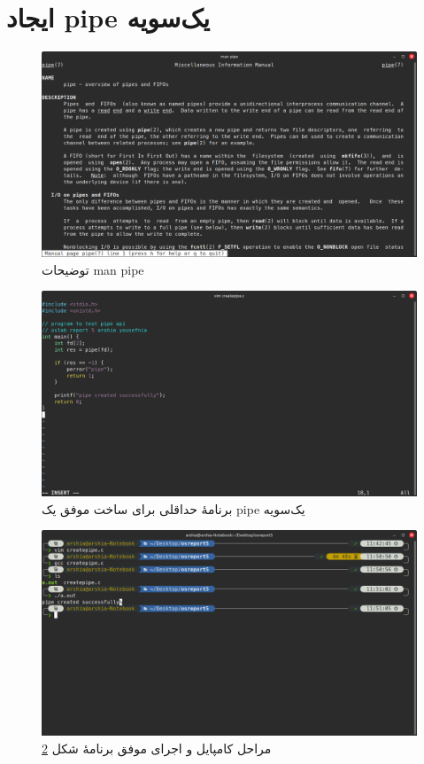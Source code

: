 \documentclass[12pt]{article}
\begin{document}
	\section{ایجاد \textenglish{pipe} یک‌سویه}
	\begin{figure}[H]
		\centering
		\includegraphics[width=\textwidth]{report5-resources/1.png}
		\caption{توضیحات \textenglish{man pipe}}
		\label{img:1}
	\end{figure}
	\begin{figure}[H]
		\centering
		\includegraphics[width=\textwidth]{report5-resources/2.png}
		\caption{برنامهٔ حداقلی برای ساخت موفق یک \textenglish{pipe} یک‌سویه}
		\label{img:2}
	\end{figure}
	\begin{figure}[H]
		\centering
		\includegraphics[width=\textwidth]{report5-resources/3.png}
		\caption{مراحل کامپایل و اجرای موفق برنامهٔ شکل \ref{img:2}}
		\label{img:3}
	\end{figure}
\end{document}
